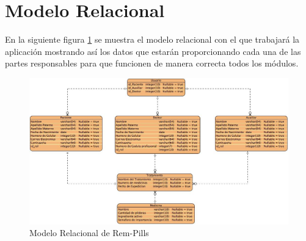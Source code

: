 \section{Modelo Relacional}
En la siguiente figura \ref{fig:modelorelacional} se muestra el modelo relacional con el que trabajará la aplicación mostrando así los datos que estarán proporcionando cada una de las partes responsables para que funcionen de manera correcta todos los módulos.
\begin{figure}[htb]
	\centering
	\includegraphics[width=1.1\textwidth]{images/cap2/modelorelacional}
	\caption{Modelo Relacional de Rem-Pills} \label{fig:modelorelacional}
\end{figure} 




